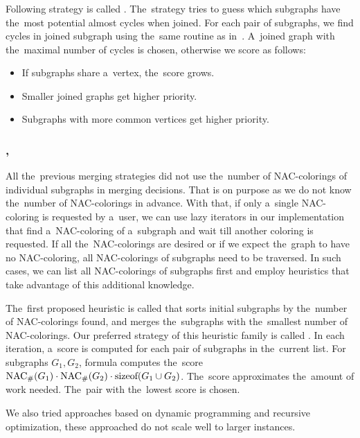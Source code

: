 \subsubsection*{\PromisingCycles{}}

Following strategy is called \PromisingCycles{}.
The~strategy tries to guess which subgraphs
have the~most potential almost cycles when joined.
For each pair of subgraphs, we find cycles in joined subgraph using
the~same routine as in~.
A~joined graph with the~maximal number of cycles is chosen,
otherwise we score as follows:
%
\begin{itemize}
	\item If subgraphs share a~vertex, the~score grows.
	\item Smaller joined graphs get higher priority.
	\item Subgraphs with more common vertices get higher priority.
\end{itemize}
%

\subsubsection*{\SortedSize{}, \Score{}}

All the~previous merging strategies did not use the~number of NAC-colorings
of individual subgraphs in merging decisions.
That is on purpose as we do not know the~number of NAC-colorings in advance.
With that, if only a~single NAC-coloring is requested by a~user,
we can use lazy iterators in our implementation that
find a~NAC-coloring of a~subgraph and wait till another coloring is requested.
If all the~NAC-colorings are desired or if we expect the~graph to have no NAC-coloring,
all NAC-colorings of subgraphs need to be traversed.
In such cases, we can list all NAC-colorings of subgraphs first
and employ heuristics that take advantage of this additional knowledge.

The~first proposed heuristic is called \SortedSize{}
that sorts initial subgraphs by the~number of NAC-colorings found,
and merges the~subgraphs with the~smallest number of NAC-colorings.
%
Our preferred strategy of this heuristic family is called \Score{}.
In each iteration, a~score is computed for each pair of subgraphs in the~current list.
For subgraphs \( G_1, G_2 \), formula computes the~score
\( \operatorname{NAC}_{\#} (G_1) \cdot \operatorname{NAC}_{\#} (G_2) \cdot \text{sizeof}(G_1 \cup G_2) \).
The~score approximates the~amount of work needed.
The~pair with the~lowest score is chosen.

We also tried approaches based on dynamic programming and recursive optimization,
these approached do not scale well to larger instances.

